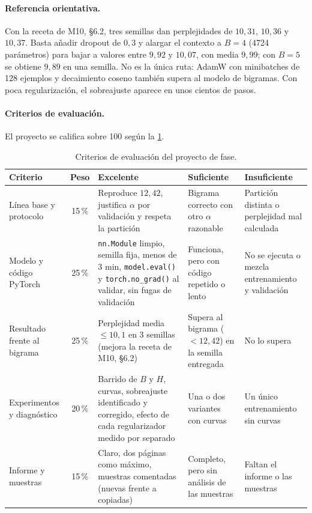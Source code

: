 \paragraph{Referencia orientativa.} Con la receta de M10, §6.2, tres semillas dan perplejidades de $10{,}31$, $10{,}36$ y $10{,}37$. Basta añadir dropout de $0{,}3$ y alargar el contexto a $B=4$ (4724 parámetros) para bajar a valores entre $9{,}92$ y $10{,}07$, con media $9{,}99$; con $B=5$ se obtiene $9{,}89$ en una semilla. No es la única ruta: AdamW con minibatches de 128 ejemplos y decaimiento coseno también supera al modelo de bigramas. Con poca regularización, el sobreajuste aparece en unos cientos de pasos.

\paragraph{Criterios de evaluación.} El proyecto se califica sobre 100 según la \cref{tab:criterios}.

\begin{table}[h]
\centering\small
\caption{Criterios de evaluación del proyecto de fase.}\label{tab:criterios}
\renewcommand{\arraystretch}{1.15}
\begin{tabularx}{\textwidth}{@{}>{\raggedright\arraybackslash}p{2.3cm}c>{\raggedright\arraybackslash}X>{\raggedright\arraybackslash}X>{\raggedright\arraybackslash}X@{}}
\toprule
Criterio & Peso & Excelente & Suficiente & Insuficiente \\
\midrule
Línea base y protocolo & 15\,\% & Reproduce $12{,}42$, justifica $\alpha$ por validación y respeta la partición & Bigrama correcto con otro $\alpha$ razonable & Partición distinta o perplejidad mal calculada \\
\addlinespace
Modelo y código PyTorch & 25\,\% & \texttt{nn.Module} limpio, semilla fija, menos de 3 min, \texttt{model.eval()} y \texttt{torch.no\_grad()} al validar, sin fugas de validación & Funciona, pero con código repetido o lento & No se ejecuta o mezcla entrenamiento y validación \\
\addlinespace
Resultado frente al bigrama & 25\,\% & Perplejidad media $\le 10{,}1$ en 3 semillas (mejora la receta de M10, §6.2) & Supera al bigrama ($<12{,}42$) en la semilla entregada & No lo supera \\
\addlinespace
Experimentos y diagnóstico & 20\,\% & Barrido de $B$ y $H$, curvas, sobreajuste identificado y corregido, efecto de cada regularizador medido por separado & Una o dos variantes con curvas & Un único entrenamiento sin curvas \\
\addlinespace
Informe y muestras & 15\,\% & Claro, dos páginas como máximo, muestras comentadas (nuevas frente a copiadas) & Completo, pero sin análisis de las muestras & Faltan el informe o las muestras \\
\bottomrule
\end{tabularx}
\end{table}
